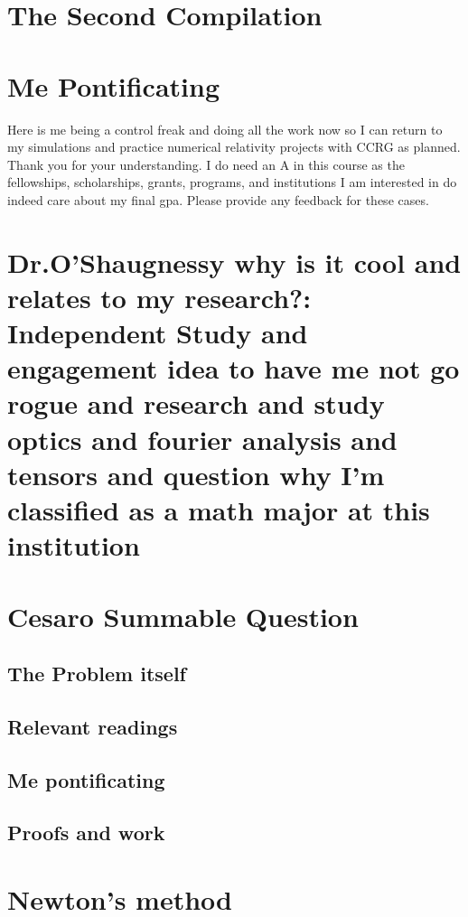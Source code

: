 \newpage
\section{The Second Compilation}
\section*{Me Pontificating}
Here is me being a control freak and doing all the work now so I can return to my simulations and practice numerical relativity projects with CCRG as planned. Thank you for your understanding. I do need an A in this course as the fellowships, scholarships, grants, programs, and institutions I am interested in do indeed care about my final gpa. Please provide any feedback for these cases. \\ 

\section*{Dr.O'Shaugnessy why is it cool and relates to my research?: Independent Study and engagement idea to have me not go rogue and research and study optics and fourier analysis and tensors and question why I'm classified as a math major at this institution}

\section{Cesaro Summable Question }

\subsection{The Problem itself}


\subsection{Relevant readings}

\subsection{Me pontificating}


\subsection{Proofs and work}


\section{Newton's method}

